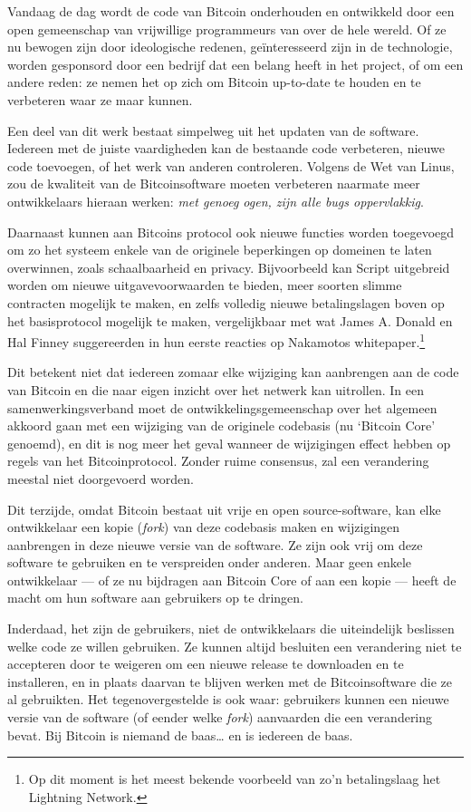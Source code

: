 \documentclass[
  a5paper,
  smalldemyvopaper,11pt,twoside,onecolumn,openright,extrafontsizes]{memoir}
\begin{document}
Vandaag de dag wordt de code van Bitcoin onderhouden en ontwikkeld door
een open gemeenschap van vrijwillige programmeurs van over de hele
wereld. Of ze nu bewogen zijn door ideologische redenen, geïnteresseerd
zijn in de technologie, worden gesponsord door een bedrijf dat een
belang heeft in het project, of om een andere reden: ze nemen het op
zich om Bitcoin up-to-date te houden en te verbeteren waar ze maar
kunnen.

Een deel van dit werk bestaat simpelweg uit het updaten van de software.
Iedereen met de juiste vaardigheden kan de bestaande code verbeteren,
nieuwe code toevoegen, of het werk van anderen controleren. Volgens de
Wet van Linus, zou de kwaliteit van de Bitcoinsoftware moeten verbeteren
naarmate meer ontwikkelaars hieraan werken: \emph{met genoeg ogen, zijn
alle bugs oppervlakkig}.

Daarnaast kunnen aan Bitcoins protocol ook nieuwe functies worden
toegevoegd om zo het systeem enkele van de originele beperkingen op
domeinen te laten overwinnen, zoals schaalbaarheid en privacy.
Bijvoorbeeld kan Script uitgebreid worden om nieuwe uitgavevoorwaarden
te bieden, meer soorten slimme contracten mogelijk te maken, en zelfs
volledig nieuwe betalingslagen boven op het basisprotocol mogelijk te
maken, vergelijkbaar met wat James A. Donald en Hal Finney suggereerden
in hun eerste reacties op Nakamotos whitepaper.\footnote{Op dit moment
  is het meest bekende voorbeeld van zo'n betalingslaag het Lightning
  Network.}

Dit betekent niet dat iedereen zomaar elke wijziging kan aanbrengen aan
de code van Bitcoin en die naar eigen inzicht over het netwerk kan
uitrollen. In een samenwerkingsverband moet de ontwikkelingsgemeenschap
over het algemeen akkoord gaan met een wijziging van de originele
codebasis (nu `Bitcoin Core' genoemd), en dit is nog meer het geval
wanneer de wijzigingen effect hebben op regels van het Bitcoinprotocol.
Zonder ruime consensus, zal een verandering meestal niet doorgevoerd
worden.

Dit terzijde, omdat Bitcoin bestaat uit vrije en open source-software,
kan elke ontwikkelaar een kopie (\emph{fork}) van deze codebasis maken
en wijzigingen aanbrengen in deze nieuwe versie van de software. Ze zijn
ook vrij om deze software te gebruiken en te verspreiden onder anderen.
Maar geen enkele ontwikkelaar --- of ze nu bijdragen aan Bitcoin Core of
aan een kopie --- heeft de macht om hun software aan gebruikers op te
dringen.

Inderdaad, het zijn de gebruikers, niet de ontwikkelaars die
uiteindelijk beslissen welke code ze willen gebruiken. Ze kunnen altijd
besluiten een verandering niet te accepteren door te weigeren om een
nieuwe release te downloaden en te installeren, en in plaats daarvan te
blijven werken met de Bitcoinsoftware die ze al gebruikten. Het
tegenovergestelde is ook waar: gebruikers kunnen een nieuwe versie van
de software (of eender welke \emph{fork}) aanvaarden die een verandering
bevat. Bij Bitcoin is niemand de baas\ldots{} en is iedereen de baas.
\end{document}
